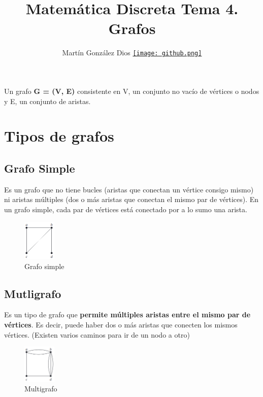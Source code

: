 \documentclass{article}
\title{Matemática Discreta Tema 4. Grafos}
\author{Martín González Dios 
\href{https://github.com/martindios}{\texttt{[image: github.png]}}}
\begin{document}
\maketitle

Un grafo \textbf{G = (V, E)} consistente en V, un conjunto no vacío de vértices o nodos y E, un conjunto de aristas. \\

\section{Tipos de grafos}

\subsection{Grafo Simple}
Es un grafo que no tiene bucles (aristas que conectan un vértice consigo mismo) ni aristas múltiples (dos o más aristas que conectan el mismo par de vértices). En un grafo simple, cada par de vértices está conectado por a lo sumo una arista.

\begin{figure}[h]
    \centering
    \includegraphics[width=0.14\textwidth]{img-t4/img_912_48.png}
    \caption{Grafo simple}
\end{figure}

\subsection{Mutligrafo}
Es un tipo de grafo que \textbf{permite múltiples aristas entre el mismo par de vértices}. Es decir, puede haber dos o más aristas que conecten los mismos vértices. (Existen varios caminos para ir de un nodo a otro)

\begin{figure}[h]
    \centering
    \includegraphics[width=0.14\textwidth]{img-t4/img_205_31.png}
    \caption{Multigrafo}
\end{figure}
\end{document}
